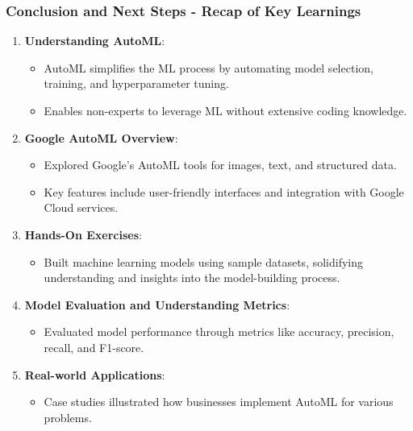 \documentclass[aspectratio=169]{beamer}
\begin{document}
\begin{frame}[fragile]
  \frametitle{Conclusion and Next Steps - Recap of Key Learnings}
  
  \begin{enumerate}
      \item \textbf{Understanding AutoML}: 
          \begin{itemize}
              \item AutoML simplifies the ML process by automating model selection, training, and hyperparameter tuning.
              \item Enables non-experts to leverage ML without extensive coding knowledge.
          \end{itemize}
      
      \item \textbf{Google AutoML Overview}: 
          \begin{itemize}
              \item Explored Google’s AutoML tools for images, text, and structured data.
              \item Key features include user-friendly interfaces and integration with Google Cloud services.
          \end{itemize}
      
      \item \textbf{Hands-On Exercises}: 
          \begin{itemize}
              \item Built machine learning models using sample datasets, solidifying understanding and insights into the model-building process.
          \end{itemize}
      
      \item \textbf{Model Evaluation and Understanding Metrics}: 
          \begin{itemize}
              \item Evaluated model performance through metrics like accuracy, precision, recall, and F1-score.
          \end{itemize}
      
      \item \textbf{Real-world Applications}: 
          \begin{itemize}
              \item Case studies illustrated how businesses implement AutoML for various problems.
          \end{itemize}
  \end{enumerate}
\end{frame}
\end{document}
